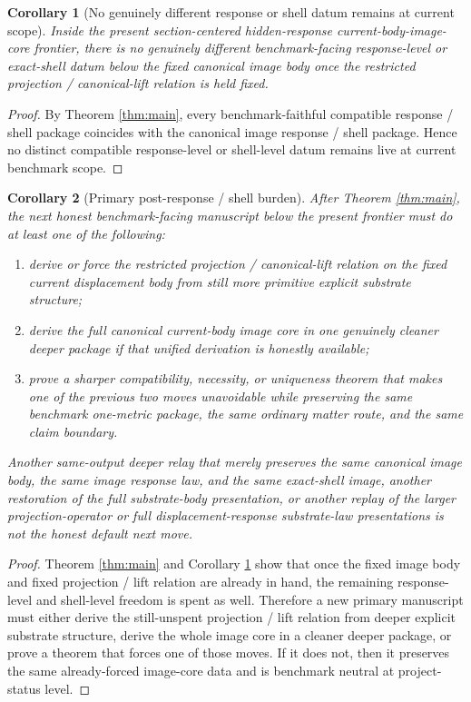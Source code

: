 \documentclass[11pt]{article}
\newtheorem{corollary}{Corollary}
\begin{document}
\begin{corollary}[No genuinely different response or shell datum remains at current scope]
\label{cor:minimal}
Inside the present section-centered hidden-response current-body-image-core frontier, there is no genuinely different benchmark-facing response-level or exact-shell datum below the fixed canonical image body once the restricted projection / canonical-lift relation is held fixed.
\end{corollary}

\begin{proof}
By Theorem \ref{thm:main}, every benchmark-faithful compatible response / shell package coincides with the canonical image response / shell package. Hence no distinct compatible response-level or shell-level datum remains live at current benchmark scope.
\end{proof}

\begin{corollary}[Primary post-response / shell burden]
\label{cor:next}
After Theorem \ref{thm:main}, the next honest benchmark-facing manuscript below the present frontier must do at least one of the following:
\begin{enumerate}
    \item derive or force the restricted projection / canonical-lift relation on the fixed current displacement body from still more primitive explicit substrate structure;
    \item derive the full canonical current-body image core in one genuinely cleaner deeper package if that unified derivation is honestly available;
    \item prove a sharper compatibility, necessity, or uniqueness theorem that makes one of the previous two moves unavoidable while preserving the same benchmark one-metric package, the same ordinary matter route, and the same claim boundary.
\end{enumerate}
Another same-output deeper relay that merely preserves the same canonical image body, the same image response law, and the same exact-shell image, another restoration of the full substrate-body presentation, or another replay of the larger projection-operator or full displacement-response substrate-law presentations is not the honest default next move.
\end{corollary}

\begin{proof}
Theorem \ref{thm:main} and Corollary \ref{cor:minimal} show that once the fixed image body and fixed projection / lift relation are already in hand, the remaining response-level and shell-level freedom is spent as well. Therefore a new primary manuscript must either derive the still-unspent projection / lift relation from deeper explicit substrate structure, derive the whole image core in a cleaner deeper package, or prove a theorem that forces one of those moves. If it does not, then it preserves the same already-forced image-core data and is benchmark neutral at project-status level.
\end{proof}
\end{document}
